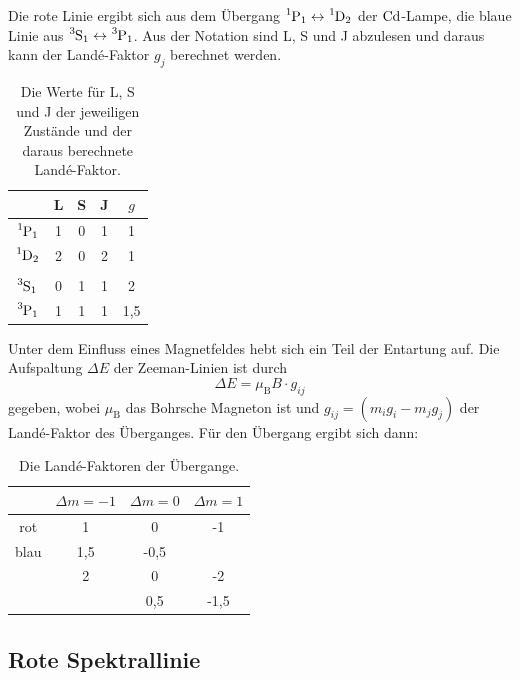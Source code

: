   \noindent 
  Die rote Linie ergibt sich aus dem Übergang $\ce{^1P_1} \leftrightarrow \ce{^1D_2}$ der $\ce{Cd}$-Lampe, die blaue Linie aus 
  $\ce{^3S_1} \leftrightarrow \ce{^3P_1}$. Aus der Notation sind L, S und J 
  abzulesen und daraus kann der Land\'{e}-Faktor $g_{j}$ berechnet werden.  
  \begin{table}[H]
    \centering
    \caption{Die Werte für L, S und J der jeweiligen Zustände und der daraus berechnete Land\'{e}-Faktor.}
    \begin{tabular}{c c c c c}
      \toprule
       & L & S & J & $g$ \\ 
      \midrule
       $\ce{^1P_1}$ & 1 & 0 & 1 & 1 \\
       $\ce{^1D_2}$ & 2 & 0 & 2 & 1 \\
       \\ 
       $\ce{^3S_1}$ & 0 & 1 & 1 & 2 \\
       $\ce{^3P_1}$ & 1 & 1 & 1 & 1,5\\
      \bottomrule
    \end{tabular}
  \end{table}
  Unter dem Einfluss eines Magnetfeldes hebt sich ein Teil der Entartung auf. Die Aufspaltung $\Delta E$ der Zeeman-Linien ist durch 
  \begin{equation*}
    \Delta E = \mu_\text{B} B \cdot g_{ij}
  \end{equation*}
  gegeben, wobei $\mu_\text{B}$ das Bohrsche Magneton ist und $g_{ij} = \left(m_ig_i - m_jg_j\right)$ der Land\'{e}-Faktor des Überganges. 
  Für den Übergang ergibt sich dann:
  \begin{table}
    \centering
    \caption{Die Land\'{e}-Faktoren der Übergange.}
    \begin{tabular}{c | c c c }
      \toprule
      {} & {$\Delta m = \num{-1}$} & {$\Delta m = \num{0}$} & {$\Delta m = \num{1}$}\\
      \midrule
      rot & 1 & 0 & -1 \\
      blau & 1,5 & -0,5 & \\
      & 2 & 0 & -2 \\
      &  & 0,5 &-1,5 \\ 
      \bottomrule            
    \end{tabular}
  \end{table}

\subsection{Rote Spektrallinie}

